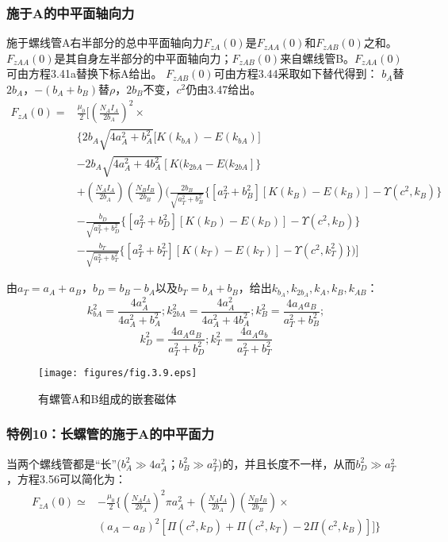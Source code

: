 \subsubsection{施于A的中平面轴向力}
施于螺线管A右半部分的总中平面轴向力$F_{zA}(0)$是$F_{zAA}(0)$和$F_{zAB}(0)$之和。$F_{zAA}(0)$是其自身左半部分的中平面轴向力；$F_{zAB}(0)$来自螺线管B。$F_{zAA}(0)$可由方程3.41a替换下标A给出。 $F_{zAB}(0)$可由方程3.44采取如下替代得到： $b_A$替$2b_A$，$−(b_A+b_B)$替$\rho$，$2b_B$不变，$c^2$仍由3.47给出。
\begin{equation}
\begin{split}
F_{zA}(0)=&\frac{\mu_0}{2}[(\frac{N_A I_A}{2b_A})^2\times \\
&\{{2b_A\sqrt{4a_A^2+b_A^2}[K(k_{bA})-E(k_{bA})}]\\
&-2b_A\sqrt{4a_A^2+4b_A^2}[K(k_{2bA}-E(k_{2bA}]\}\\
&+(\frac{N_AI_A}{2b_A})(\frac{N_BI_B}{2b_B})(\frac{2b_B}{\sqrt{a_T^2+b_B^2}}\{[a_T^2+b_B^2][K(k_B)-E(k_{B})]-\Upsilon(c^2,k_B)\}\\
&-\frac{b_D}{\sqrt{a_T^2+b_D^2}}\{{[a_T^2+b_D^2][K(k_D)-E(k_D)]-\Upsilon(c^2,k_D)}\}\\
&-\frac{b_T}{\sqrt{a_T^2+b_T^2}}\{[a_T^2+b_T^2][K(k_T)-E(k_T)]-\Upsilon(c^2,k_T^2)\})]
\end{split}
\end{equation}

由$a_T=a_A+a_B$，$b_D=b_B-b_A$以及$b_T=b_A+b_B$，给出$k_{b_A}, k_{2b_A}, k_A,k_B, k_{AB}$：
$$ k_{bA}^2=\frac{4a_A^2}{4a_A^2+b_A^2}; k_{2bA}^2=\frac{4a_A^2}{4a_A^2+4b_A^2}; k_B^2=\frac{4a_Aa_B}{a_T^2+b_B^2};$$
$$k_D^2=\frac{4a_Aa_B}{a_T^2+b_D^2}; k_T^2=\frac{4a_Aa_b}{a_T^2+b_T^2}$$

\begin{figure}[htbp]
  \centering
 \texttt{[image: figures/fig.3.9.eps]}
  \caption{有螺管A和B组成的嵌套磁体}
\end{figure}

\subsubsection{特例10：长螺管的施于A的中平面力}
当两个螺线管都是“长”($b_A^2\gg 4a_A^2；b_B^2\gg a_T^2$)的，并且长度不一样，从而$b_D^2\gg a_T^2$，方程3.56可以简化为：
\begin{equation}
\begin{split}
F_{zA}(0)\simeq& -\frac{\mu_0}{2}\{(\frac{N_AI_A}{2b_A})^2\pi a_A^2+(\frac{N_AI_A}{2b_A})(\frac{N_BI_B}{2b_{B}})\times\\
&(a_A-a_B)^2[\Pi(c^2,k_D)+\Pi(c^2,k_T)-2\Pi(c^2,k_B)]]\}
\end{split}
\end{equation}

